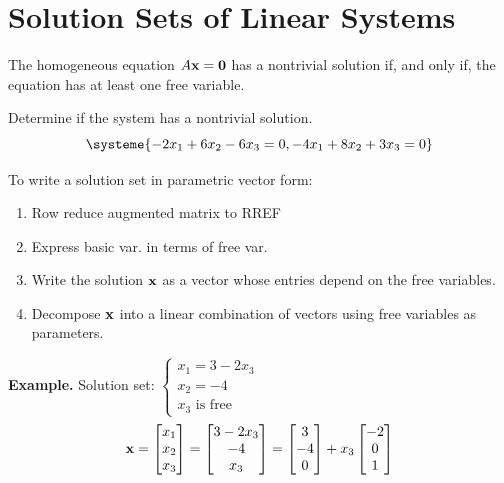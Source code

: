 \newpage

\section{Solution Sets of Linear Systems}
\name[2in]

\begin{boxme}
	The homogeneous equation $A\boldsymbol{\mathbf{x}}=\boldsymbol{\mathbf{0}}$ has a nontrivial solution if, and only if, the equation has at least one free variable.
\end{boxme}
\begin{exercise} %
	Determine if the system has a nontrivial solution.
	$$\systeme{-2x_1+6x_2-6x_3=0,-4x_1+8x_2+3x_3=0}$$
\end{exercise}
\vfill

\begin{boxme}
	\begin{multicols}{2}
	To write a solution set in parametric vector form:
	\begin{enumerate}[(1)]\itemsep0em 
		\item Row reduce augmented matrix to RREF
		\item Express basic var. in terms of free var.
		\item Write the solution $\boldsymbol{\mathbf{x}}$ as a vector whose entries depend on the free variables.
		\item Decompose $\boldsymbol{\mathbf{x}}$ into a linear combination of vectors using free variables as parameters.
	\end{enumerate}
	
	\columnbreak
	
	\textbf{Example.}
	Solution set: $\begin{cases}x_1=3-2x_3 \\ x_2 = -4 \\ x_3 \text{ is free}\end{cases}$
	$$\boldsymbol{\mathbf{x}}=\begin{bmatrix}x_1\\x_2\\x_3\end{bmatrix}
	=\begin{bmatrix}3-2x_3\\-4\\x_3\end{bmatrix}
	=\begin{bmatrix}3\\-4\\0\end{bmatrix} +x_3\begin{bmatrix}-2\\0\\1\end{bmatrix}$$
	\end{multicols}
\end{boxme}
